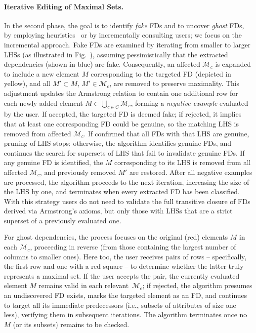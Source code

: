 \paragraph{Iterative Editing of Maximal Sets.}  
In the second phase, the goal is to identify \emph{fake} FDs and to uncover \emph{ghost} FDs, by employing heuristics~\citep{DBLP:journals/pvldb/Berti-EquilleHN18} or by incrementally consulting users; we focus on the incremental approach. Fake FDs are examined by iterating from smaller to larger LHSs (as illustrated in Fig.~), assuming pessimistically that the extracted dependencies (shown in blue) are fake. Consequently, an affected $\mathcal{M}_c$ is expanded to include a new element $M$ corresponding to the targeted FD (depicted in yellow), and all $M' \subset M$, $M' \in \mathcal{M}_c$, are removed to preserve maximality. This adjustment updates the Armstrong relation to contain one additional row for each newly added element $M \in \bigcup_{c \in C}\mathcal{M}_c$, forming a \emph{negative example} evaluated by the user.
If accepted, the targeted FD is deemed fake; if rejected, it implies that at least one corresponding FD could be genuine, so the matching LHS is removed from affected $\mathcal{M}_c$. If confirmed that all FDs with that LHS are genuine, pruning of LHS stops; otherwise, the algorithm identifies genuine FDs, and continues the search for 
supersets of LHS that fail to invalidate genuine FDs. If any genuine FD is identified, the $M$ corresponding to its LHS is removed from all affected $\mathcal{M}_c$, and previously removed $M'$ are restored. After all negative examples are processed, the algorithm proceeds to the next iteration, increasing the size of the LHS by one, and terminates when every extracted FD has been classified. With this strategy users do not need to validate the full transitive closure of FDs derived via Armstrong's axioms, but only those with LHSs that are a strict superset of a previously evaluated one.

For ghost dependencies, the process focuses on the original (red) elements $M$ in each $\mathcal{M}_c$, proceeding in reverse (from those containing the largest number of columns to smaller ones). Here too, the user receives pairs of rows -- specifically, the first row and one with a red square -- to determine whether the latter truly represents a maximal set. %
If the user accepts the pair, the currently evaluated element $M$ remains valid in each relevant~$\mathcal{M}_c$; if rejected, the algorithm presumes an undiscovered FD exists, marks the targeted element as an FD, and continues to target all its immediate predecessors (i.e., subsets of attributes of size one less), verifying them in subsequent iterations. The algorithm terminates once no $M$ (or its subsets) remains to be checked. 

